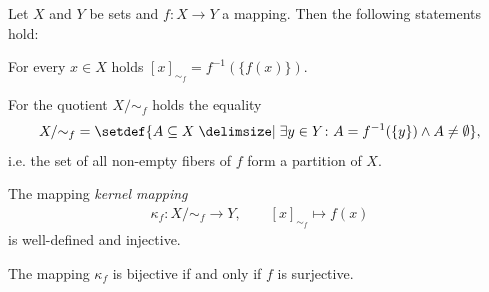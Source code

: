 \begin{theorem}
    Let $X$ and $Y$ be sets and $f\colon X\rightarrow Y$ a mapping. Then the following statements hold:
    \begin{intheoremenumerate}
        \item For every $x\in X$ holds $[x]_{\sim_f}=f^{-1}(\{f(x)\})$.
        \item For the quotient $X/\sim_f$ holds the equality
        \begin{align}X/{\sim_f}=\setdef{A\subseteq X\given \exists y\in Y\colon A=f^{-1}(\{y\})\land A\neq\emptyset},\end{align} i.e. the set of all non-empty fibers of $f$ form a partition of $X$.
        \item The mapping \emph{kernel mapping} \begin{align}\kappa_f\colon X/{\sim_f} \rightarrow Y,\qquad [x]_{\sim_f}\mapsto f(x)\end{align} is well-defined and injective.
        \item The mapping $\kappa_f$ is bijective if and only if $f$ is surjective.
    \end{intheoremenumerate}
\end{theorem}
